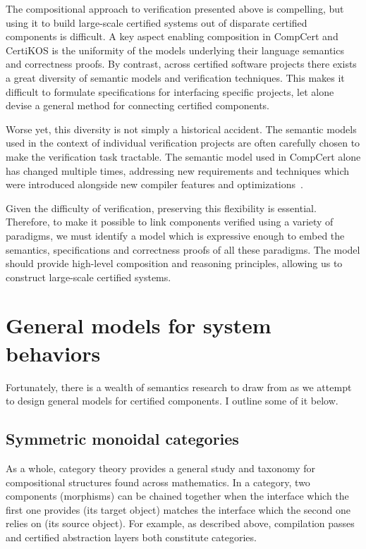 \documentclass[11pt,oneside,draft]{book}
\theoremstyle{definition}
\begin{document}
The compositional approach to verification presented above is compelling,
but using it to build large-scale certified systems
out of disparate certified components
is difficult.
A key aspect enabling composition in CompCert and CertiKOS
is the uniformity of the models underlying
their language semantics and correctness proofs.
By contrast,
across certified software projects
there exists a great diversity
of semantic models and verification techniques.
This makes it difficult to formulate
specifications for interfacing specific projects,
let alone devise a general method
for connecting certified components.

Worse yet,
this diversity is not simply a historical accident.
The semantic models
used in the context of individual verification projects
are often carefully chosen
to make the verification task tractable.
The semantic model used in CompCert alone
has changed multiple times,
addressing new requirements and techniques
which were introduced alongside
new compiler features and optimizations~\citep{compsem}.

Given the difficulty of verification,
preserving this flexibility is essential.
Therefore,
to make it possible to link components
verified using a variety of paradigms,
we must identify a model which is
expressive enough to embed
the semantics, specifications and correctness proofs
of all these paradigms.
The model should provide
high-level composition and reasoning principles,
allowing us to construct large-scale certified systems.



\section{General models for system behaviors} %
\label{ssec:genmodel}

Fortunately,
there is a wealth of semantics research to draw from
as we attempt to design general models for certified components.
I outline some of it below.

\subsection{Symmetric monoidal categories} %

As a whole,
category theory provides a general study
and taxonomy for
compositional structures found
across mathematics.
In a category,
two components (morphisms) can be chained together when
the interface which the first one provides
(its target object)
matches the interface which the second one relies on
(its source object).
For example,
as described above,
compilation passes and certified abstraction layers
both constitute categories.
\end{document}
